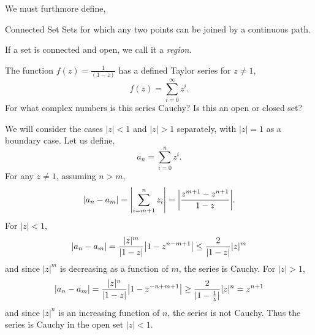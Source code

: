 \documentclass{book}
\begin{document}
We must furthmore define,
\begin{Definitions}{Connected Set}{}
	Sets for which any two points can be joined by a continuous path. 
\end{Definitions}
If a set is connected and open, we call it a \textit{region}.
\begin{Examples}{}{}
	The function $f(z) = \frac{1}{(1-z)}$ has a defined Taylor series for $z \neq 1$,
	\begin{equation}
		f(z) = \sum_{i=0}^{\infty}z^i.
	\end{equation}
	For what complex numbers is this series Cauchy? Is this an open or closed set?
\end{Examples}
We will consider the cases $|z| < 1$ and $|z| > 1$ separately, with $|z| =1$ as a boundary case. Let us define,
\begin{equation}
	a_n = \sum_{i=0}^n z^i.
\end{equation}
For any $z \neq 1$, assuming $n > m$,
\begin{equation}
	\abs{a_n - a_m} = \abs{\sum_{i = m+1}^n z_i } = \abs{\frac{z^{m+1}-z^{n+1}}{1-z}}.
\end{equation}
For $|z| < 1$,
\begin{equation}
	|a_n - a_m| = \frac{|z|^m}{|1-z|}\abs{1 - z^{n-m+1}}\leq \frac{2}{|1-z|}|z|^m
\end{equation}
and since $|z|^m$ is decreasing as a function of $m$, the series is Cauchy. For $|z|>1$,
\begin{equation}
	|a_n - a_m| = \frac{|z|^n}{|1-z|}\abs{1 - z^{-n+m+1}}\geq \frac{2}{|1-\frac{1}{z}|}|z|^n = z^{n+1}
\end{equation}
and since $|z|^{n}$ is an increasing function of $n$, the series is not Cauchy. Thus the series is Cauchy in the open set $|z| < 1$.
\end{document}
